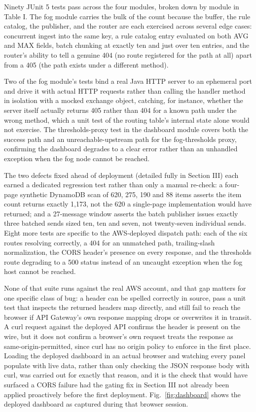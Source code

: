 \documentclass[conference]{IEEEtran}
\begin{document}
Ninety JUnit 5 tests pass across the four modules, broken down by module in Table I. The fog module carries the bulk of the count because the buffer, the rule catalog, the publisher, and the router are each exercised across several edge cases: concurrent ingest into the same key, a rule catalog entry evaluated on both AVG and MAX fields, batch chunking at exactly ten and just over ten entries, and the router's ability to tell a genuine 404 (no route registered for the path at all) apart from a 405 (the path exists under a different method).

Two of the fog module's tests bind a real Java HTTP server to an ephemeral port and drive it with actual HTTP requests rather than calling the handler method in isolation with a mocked exchange object, catching, for instance, whether the server itself actually returns 405 rather than 404 for a known path under the wrong method, which a unit test of the routing table's internal state alone would not exercise. The thresholds-proxy test in the dashboard module covers both the success path and an unreachable-upstream path for the fog-thresholds proxy, confirming the dashboard degrades to a clear error rather than an unhandled exception when the fog node cannot be reached.

The two defects fixed ahead of deployment (detailed fully in Section III) each earned a dedicated regression test rather than only a manual re-check: a four-page synthetic DynamoDB scan of 620, 275, 190 and 88 items asserts the item count returns exactly 1,173, not the 620 a single-page implementation would have returned; and a 27-message window asserts the batch publisher issues exactly three batched sends sized ten, ten and seven, not twenty-seven individual sends. Eight more tests are specific to the AWS-deployed dispatch path: each of the six routes resolving correctly, a 404 for an unmatched path, trailing-slash normalization, the CORS header's presence on every response, and the thresholds route degrading to a 500 status instead of an uncaught exception when the fog host cannot be reached.

None of that suite runs against the real AWS account, and that gap matters for one specific class of bug: a header can be spelled correctly in source, pass a unit test that inspects the returned headers map directly, and still fail to reach the browser if API Gateway's own response mapping drops or overwrites it in transit. A curl request against the deployed API confirms the header is present on the wire, but it does not confirm a browser's own request treats the response as same-origin-permitted, since curl has no origin policy to enforce in the first place. Loading the deployed dashboard in an actual browser and watching every panel populate with live data, rather than only checking the JSON response body with curl, was carried out for exactly that reason, and it is the check that would have surfaced a CORS failure had the gating fix in Section III not already been applied proactively before the first deployment. Fig.~\ref{fig:dashboard} shows the deployed dashboard as captured during that browser session.
\end{document}

